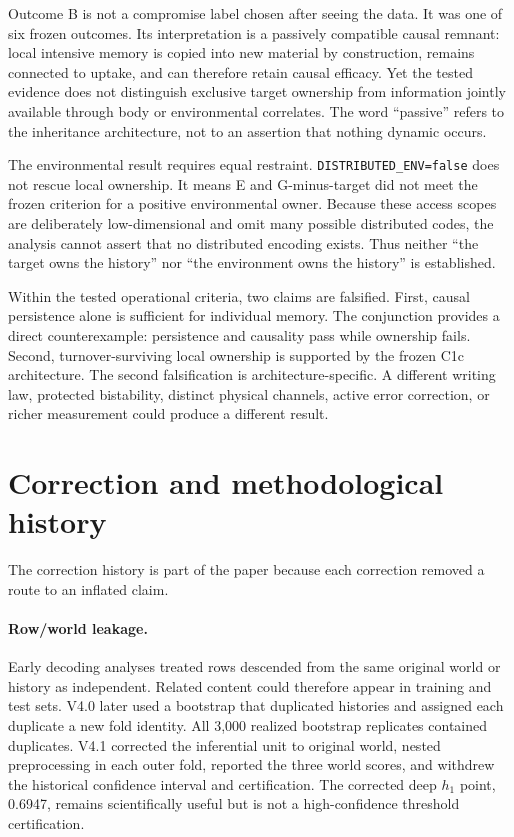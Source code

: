 \documentclass[11pt]{article}
\newcommand{\code}[1]{\texttt{#1}}
\begin{document}
Outcome B is not a compromise label chosen after seeing the data. It was one of six frozen outcomes. Its interpretation is a passively compatible causal remnant: local intensive memory is copied into new material by construction, remains connected to uptake, and can therefore retain causal efficacy. Yet the tested evidence does not distinguish exclusive target ownership from information jointly available through body or environmental correlates. The word ``passive'' refers to the inheritance architecture, not to an assertion that nothing dynamic occurs.

The environmental result requires equal restraint. \code{DISTRIBUTED\_ENV=false} does not rescue local ownership. It means E and G-minus-target did not meet the frozen criterion for a positive environmental owner. Because these access scopes are deliberately low-dimensional and omit many possible distributed codes, the analysis cannot assert that no distributed encoding exists. Thus neither ``the target owns the history'' nor ``the environment owns the history'' is established.

Within the tested operational criteria, two claims are falsified. First, causal persistence alone is sufficient for individual memory. The conjunction provides a direct counterexample: persistence and causality pass while ownership fails. Second, turnover-surviving local ownership is supported by the frozen C1c architecture. The second falsification is architecture-specific. A different writing law, protected bistability, distinct physical channels, active error correction, or richer measurement could produce a different result.

\section{Correction and methodological history}

The correction history is part of the paper because each correction removed a route to an inflated claim.

\paragraph{Row/world leakage.}
Early decoding analyses treated rows descended from the same original world or history as independent. Related content could therefore appear in training and test sets. V4.0 later used a bootstrap that duplicated histories and assigned each duplicate a new fold identity. All 3,000 realized bootstrap replicates contained duplicates. V4.1 corrected the inferential unit to original world, nested preprocessing in each outer fold, reported the three world scores, and withdrew the historical confidence interval and certification. The corrected deep $h_1$ point, 0.6947, remains scientifically useful but is not a high-confidence threshold certification.
\end{document}
